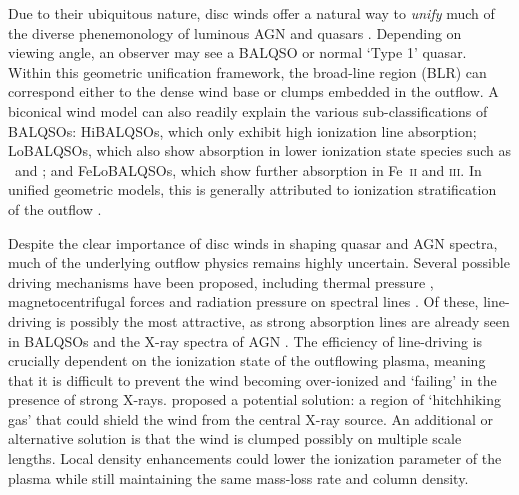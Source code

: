 \documentclass[useAMS,usenatbib]{mn2e_x}
\begin{document}
Due to their ubiquitous nature,
disc winds offer a natural way to {\em unify} much of the
diverse phenemonology of luminous AGN and quasars \citep[e.g.][]{MCGV95, elvis2000}. 
Depending on viewing angle, an observer 
may see a BALQSO or normal `Type 1' quasar.
Within this geometric unification framework, the broad-line region (BLR) can 
correspond either to the dense wind base or clumps embedded
in the outflow. 
A biconical wind model can also readily explain the various sub-classifications of BALQSOs: 
HiBALQSOs, which only exhibit high ionization line absorption; LoBALQSOs, which also show
absorption in lower ionization state species such as \mg\ and \al; and
FeLoBALQSOs, which show further absorption in Fe~\textsc{ii} and \textsc{iii}.
In unified geometric models, this is generally attributed to ionization stratification
of the outflow \citep[e.g.][]{elvis2000}.

Despite the clear importance of disc winds in shaping quasar and AGN spectra,  
much of the underlying outflow physics remains highly uncertain. 
Several possible driving mechanisms have been proposed, including
thermal pressure \citep{weymann1982, begelman1991}, magnetocentrifugal forces 
\citep{blandfordpayne,pelletier_pudritz} and 
radiation pressure on spectral lines \citep[`line-driving';][]{lucysolomon1970,shlosman1985,MCGV95}.
Of these, line-driving is possibly the most attractive, as
strong absorption lines are already seen in BALQSOs and the X-ray spectra of AGN 
\citep{reeves2003,poundsreeves2009,tombesi2010a}.
The efficiency of line-driving is crucially dependent on the ionization state 
of the outflowing plasma, meaning that it is difficult to prevent 
the wind becoming over-ionized and `failing' in the presence of strong X-rays. 
\cite{MCGV95} proposed a potential solution: 
a region of `hitchhiking gas' that could shield the wind from the central X-ray source. 
An additional or alternative solution is that the wind is clumped 
\citep[e.g.][]{hamann2013}
possibly on multiple scale lengths. Local density enhancements could lower the 
ionization parameter of the plasma while still maintaining the same mass-loss 
rate and column density. 
\end{document}
